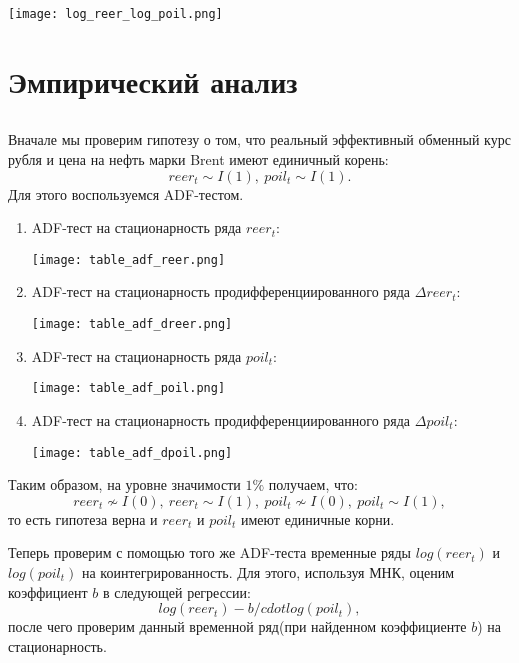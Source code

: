 \documentclass{article}
\begin{document}
\begin{center}
\texttt{[image: log\_reer\_log\_poil.png]}
\end{center}

\section{Эмпирический анализ}
\subsection{}
Вначале мы проверим гипотезу о том, что реальный эффективный обменный курс рубля и цена на нефть марки Brent имеют единичный корень:
$$reer_t\sim I(1),~poil_t\sim I(1).$$
Для этого воспользуемся ADF-тестом.
\begin{enumerate}
\item ADF-тест на стационарность ряда $reer_t$:
\begin{center}
\texttt{[image: table\_adf\_reer.png]}
\end{center}

\item ADF-тест на стационарность продифференциированного ряда 
$\Delta reer_t$:
\begin{center}
\texttt{[image: table\_adf\_dreer.png]}
\end{center}

\item ADF-тест на стационарность ряда $poil_t$:
\begin{center}
\texttt{[image: table\_adf\_poil.png]}
\end{center}

\item ADF-тест на стационарность продифференциированного ряда 
$\Delta poil_t$:
\begin{center}
\texttt{[image: table\_adf\_dpoil.png]}
\end{center}
\end{enumerate}
Таким образом, на уровне значимости $1\%$ получаем, что:
$$reer_t\nsim I(0),~reer_t\sim I(1),~poil_t\nsim I(0),~poil_t\sim I(1),$$
то есть гипотеза верна и $reer_t$ и $poil_t$ имеют единичные корни.

Теперь проверим с помощью того же ADF-теста временные ряды $log(reer_t)$ и $log(poil_t)$ на коинтегрированность. Для этого, используя МНК, оценим коэффициент $b$ в следующей регрессии:
$$log(reer_t)-b/cdot log(poil_t),$$
после чего проверим данный временной ряд(при найденном коэффициенте $b$) на стационарность.
\end{document}
